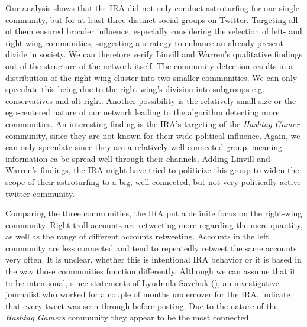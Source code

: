 \documentclass[12pt, titlepage=true, toc=bib]{scrartcl}
\begin{document}
Our analysis shows that the IRA did not only conduct astroturfing for one single community, but for at least three distinct social groups on Twitter. Targeting all of them ensured broader influence, especially considering the selection of left- and right-wing communities, suggesting a strategy to enhance an already present divide in society. We can therefore verify Linvill and Warren's qualitative findings out of the structure of the network itself. The community detection results in a distribution of the right-wing cluster into two smaller communities. We can only speculate this being due to the right-wing's division into subgroups e.g. conservatives and alt-right. Another possibility is the relatively small size or the ego-centered nature of our network leading to the algorithm detecting more communities. An interesting finding is the IRA's targeting of the \textit{Hashtag Gamer} community, since they are not known for their wide political influence. Again, we can only speculate since they are a relatively well connected group, meaning information ca be spread well through their channels. Adding Linvill and Warren's findings, the IRA might have tried to politicize this group to widen the scope of their astroturfing to a big, well-connected, but not very politically active twitter community.

Comparing the three communities, the IRA put a definite focus on the right-wing community. Right troll accounts are retweeting more regarding the mere quantity, as well as the range of different accounts retweeting. Accounts in the left community are less connected and tend to repeatedly retweet the same accounts very often. It is unclear, whether this is intentional IRA behavior or it is based in the way those communities function differently. Although we can assume that it to be intentional, since statements of Lyudmila Savchuk (\cite{savchuk_inside_2018}), an investigative journalist who worked for a couple of months undercover for the IRA, indicate that every tweet was seen through before posting. Due to the nature of the \textit{Hashtag Gamers} community they appear to be the most connected. 
\end{document}

